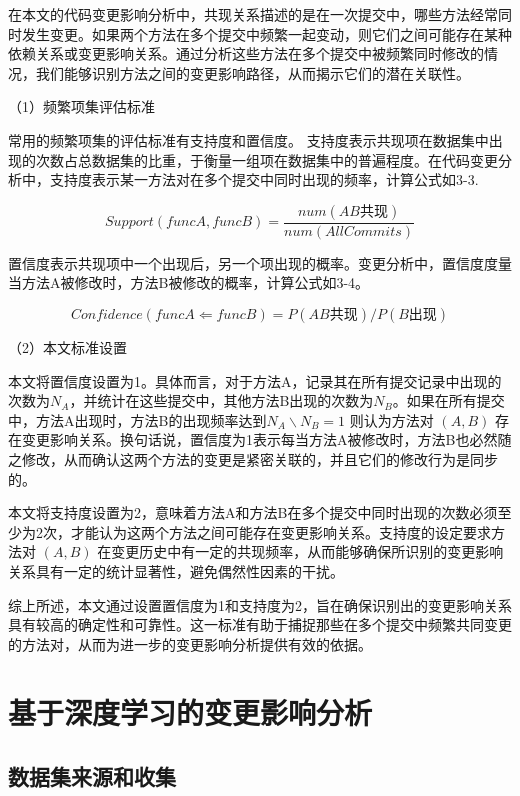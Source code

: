 在本文的代码变更影响分析中，共现关系描述的是在一次提交中，哪些方法经常同时发生变更。如果两个方法在多个提交中频繁一起变动，则它们之间可能存在某种依赖关系或变更影响关系。通过分析这些方法在多个提交中被频繁同时修改的情况，我们能够识别方法之间的变更影响路径，从而揭示它们的潜在关联性。

（1）频繁项集评估标准

常用的频繁项集的评估标准有支持度和置信度。
支持度表示共现项在数据集中出现的次数占总数据集的比重，于衡量一组项在数据集中的普遍程度。在代码变更分析中，支持度表示某一方法对在多个提交中同时出现的频率，计算公式如3-3.

\begin{equation}
Support(funcA,funcB)=\frac{num(AB共现)}{num(AllCommits)}
\end{equation}

置信度表示共现项中一个出现后，另一个项出现的概率。变更分析中，置信度度量当方法A被修改时，方法B被修改的概率，计算公式如3-4。

\begin{equation}
Confidence(funcA\Leftarrow funcB)=P(AB共现)/P(B出现)
\end{equation}

（2）本文标准设置

本文将置信度设置为1。具体而言，对于方法A，记录其在所有提交记录中出现的次数为\(N_A\)，并统计在这些提交中，其他方法B出现的次数为\(N_B\)。如果在所有提交中，方法A出现时，方法B的出现频率达到\(N_A \backslash N_B = 1\)
则认为方法对 $(A, B)$ 存在变更影响关系。换句话说，置信度为1表示每当方法A被修改时，方法B也必然随之修改，从而确认这两个方法的变更是紧密关联的，并且它们的修改行为是同步的。

本文将支持度设置为2，意味着方法A和方法B在多个提交中同时出现的次数必须至少为2次，才能认为这两个方法之间可能存在变更影响关系。支持度的设定要求方法对 $(A, B)$ 在变更历史中有一定的共现频率，从而能够确保所识别的变更影响关系具有一定的统计显著性，避免偶然性因素的干扰。


综上所述，本文通过设置置信度为1和支持度为2，旨在确保识别出的变更影响关系具有较高的确定性和可靠性。这一标准有助于捕捉那些在多个提交中频繁共同变更的方法对，从而为进一步的变更影响分析提供有效的依据。

\section{基于深度学习的变更影响分析}

\subsection{数据集来源和收集}

